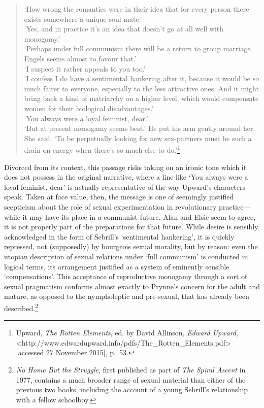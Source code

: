 \documentclass[]{article}
\begin{document}
\begin{quote}
`How wrong the romantics were in their idea that for every person there
exists somewhere a unique soul-mate.'\\
`Yes, and in practice it's an idea that doesn't go at all well with
monogamy.'\\
`Perhaps under full communism there will be a return to group marriage.
Engels seems almost to favour that.'\\
`I suspect it rather appeals to you too.'\\
`I confess I do have a sentimental hankering after it, because it would
be so much fairer to everyone, especially to the less attractive ones.
And it might bring back a kind of matriarchy on a higher level, which
would compensate women for their biological disadvantages.'\\
`You always were a loyal feminist, dear.'\\
`But at present monogamy seems best.' He put his arm gently around her.
She said: `To be perpetually looking for new sex-partners must be such a
drain on energy when there's so much else to do.'\footnote{Upward,
  \emph{The Rotten Elements}, ed. by David Allinson, \emph{Edward
  Upward},
  \textless{}http://www.edwardupward.info/pdfs/The\_Rotten\_Elements.pdf\textgreater{}
  {[}accessed 27 November 2015{]}, p.~53.}
\end{quote}

\noindent Divorced from its context, this passage risks taking on an
ironic tone which it does not possess in the original narrative, where a
line like `You always were a loyal feminist, dear' is actually
representative of the way Upward's characters speak. Taken at face
value, then, the message is one of seemingly justified scepticism about
the role of sexual experimentation in revolutionary practice---while it
may have its place in a communist future, Alan and Elsie seem to agree,
it is not properly part of the preparations for that future. While
desire is sensibly acknowledged in the form of Sebrill's `sentimental
hankering', it is quickly repressed, not (supposedly) by bourgeois
sexual morality, but by reason: even the utopian description of sexual
relations under `full communism' is conducted in logical terms, its
arrangement justified as a system of eminently sensible `compensations'.
This acceptance of reproductive monogamy through a sort of sexual
pragmatism conforms almost exactly to Prynne's concern for the adult and
mature, as opposed to the nympholeptic and pre-sexual, that has already
been described.\footnote{\emph{No Home But the Struggle}, first
  published as part of \emph{The Spiral Ascent} in 1977, contains a much
  broader range of sexual material than either of the previous two
  books, including the account of a young Sebrill's relationship with a
  fellow schoolboy.}
\end{document}
